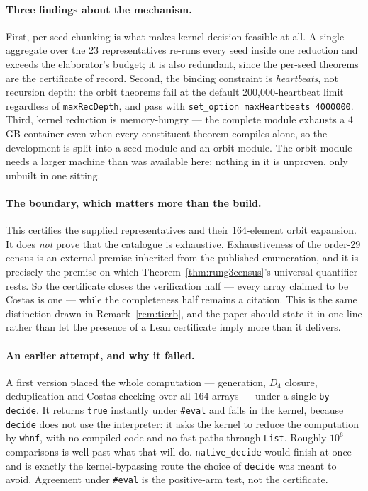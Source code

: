 \documentclass[11pt,a4paper]{article}
\theoremstyle{definition}
\begin{document}
\paragraph{Three findings about the mechanism.} First, per-seed chunking is what
makes kernel decision feasible at all. A single aggregate over the 23
representatives re-runs every seed inside one reduction and exceeds the
elaborator's budget; it is also redundant, since the per-seed theorems are the
certificate of record. Second, the binding constraint is \emph{heartbeats}, not
recursion depth: the orbit theorems fail at the default 200{,}000-heartbeat limit
regardless of \texttt{maxRecDepth}, and pass with
\texttt{set\_option maxHeartbeats 4000000}. Third, kernel reduction is
memory-hungry --- the complete module exhausts a 4\,GB container even when every
constituent theorem compiles alone, so the development is split into a seed
module and an orbit module. The orbit module needs a larger machine than was
available here; nothing in it is unproven, only unbuilt in one sitting.

\paragraph{The boundary, which matters more than the build.} This certifies the
supplied representatives and their 164-element orbit expansion. It does
\emph{not} prove that the catalogue is exhaustive. Exhaustiveness of the order-29
census is an external premise inherited from the published enumeration, and it is
precisely the premise on which Theorem~\ref{thm:rung3census}'s universal quantifier
rests. So the certificate closes the verification half --- every array claimed to
be Costas is one --- while the completeness half remains a citation. This is the
same distinction drawn in Remark~\ref{rem:tierb}, and the paper should state it
in one line rather than let the presence of a Lean certificate imply more than it
delivers.

\paragraph{An earlier attempt, and why it failed.} A first version placed the
whole computation --- generation, $D_4$ closure, deduplication and Costas
checking over all 164 arrays --- under a single \texttt{by decide}. It returns
\texttt{true} instantly under \texttt{\#eval} and fails in the kernel, because
\texttt{decide} does not use the interpreter: it asks the kernel to reduce the
computation by \texttt{whnf}, with no compiled code and no fast paths through
\texttt{List}. Roughly $10^6$ comparisons is well past what that will do.
\texttt{native\_decide} would finish at once and is exactly the kernel-bypassing
route the choice of \texttt{decide} was meant to avoid. Agreement under
\texttt{\#eval} is the positive-arm test, not the certificate.
\end{document}
